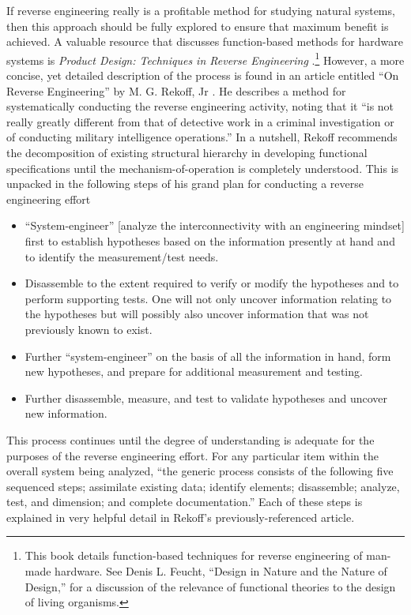If reverse engineering really is a profitable method for studying
natural systems, then this approach should be fully explored to ensure
that maximum benefit is achieved. A valuable resource that discusses
function-based methods for hardware systems is \textit{Product Design:
Techniques in Reverse Engineering} \citep{ottowood2001}.\footnote{%
This book details function-based
techniques for reverse engineering of man-made hardware. See Denis L.
Feucht, ``Design in Nature and the Nature of Design,''\citep{feucht1999} 
for a discussion of the relevance of
functional theories to the design of living organisms.
} However, a more
concise, yet detailed description of the process is found in an article
entitled ``On Reverse Engineering'' by M. G. Rekoff,
Jr \citep{rekoff1985}. He describes a method for systematically
conducting the reverse engineering activity, noting that it ``is not
really greatly different from that of detective work in a criminal
investigation or of conducting military intelligence
operations.''\citep[][p.~245]{rekoff1985} In a nutshell, Rekoff recommends the
decomposition of existing structural hierarchy in developing functional
specifications until the mechanism-of-operation is completely
understood. This is unpacked in the following steps of his grand plan
for conducting a reverse engineering effort{\jdots}

\begin{itemize}
\item 
``System-engineer'' [analyze the interconnectivity with an engineering
mindset] first to establish hypotheses based on the information
presently at hand and to identify the measurement/test needs.
\item 
Disassemble to the extent required to verify or modify the hypotheses
and to perform supporting tests. One will not only uncover information
relating to the hypotheses but will possibly also uncover information
that was not previously known to exist.
\item 
Further ``system-engineer'' on the basis of all the information in hand,
form new hypotheses, and prepare for additional measurement and
testing.
\item 
Further disassemble, measure, and test to validate hypotheses and
uncover new information.
\end{itemize}

This process continues until the degree of understanding is adequate for
the purposes of the reverse engineering effort. For any particular item
within the overall system being analyzed, “the generic process consists
of the following five sequenced steps; assimilate existing data;
identify elements; disassemble; analyze, test, and dimension; and
complete documentation.” Each of these steps is explained in very
helpful detail in Rekoff’s previously-referenced article.

